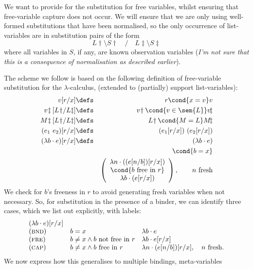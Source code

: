 We want to provide for the substitution
for free variables,
whilst ensuring that free-variable capture
does not occur.
We will ensure that we are only using well-formed substitutions
that have been normalised, so the only occurrence of list-variables
are in substitution pairs of the form
$$
L\!\!\dagger\!\setminus S\dagger \quad/\quad L\!\!\ddagger\!\setminus S\ddagger
$$
where all variables in $S$, if any, are known observation variables
(\emph{I'm not sure that this is a consequence of normalisation as described earlier}).

The scheme we follow is based on the following definition
of free-variable substitution for the $\lambda$-calculus,
(extended to (partially) support list-variables):
\begin{eqnarray*}
   v[r/x] &\defs& r \cond{x=v} v
\\ v\!\ddagger[L\!\dagger\! / L\ddagger]
   &\defs& v\!\dagger \cond{v \in \sem{L}} v\!\ddagger
\\ M\!\ddagger[L\!\dagger\! / L\ddagger]
   &\defs& L\!\dagger \cond{M=L} M\!\ddagger
\\ (e_1~e_2)[r/x] &\defs& (e_1[r/x])~(e_2[r/x])
\\ (\lambda b \cdot e)[r/x] &\defs& (\lambda b \cdot e)
\\&& \cond{b=x}
\\&& \left(
       \begin{array}{c}
         \lambda n \cdot ((e[n/b])[r/x]) \\
         \cond{b \mbox{ free in } r} \\
         \lambda b \cdot (e[r/x]) \\
       \end{array}
     \right)
     , \qquad n \mbox{ fresh}
\end{eqnarray*}
We check for $b$'s freeness in $r$ to avoid generating fresh
variables when not necessary.
So, for substitution in the presence of a binder, we can identify
three cases, which we list out explicitly, with labels:
$$\begin{array}{lll}
  (\lambda b \cdot e)[r/x]
\\ (\textsc{bnd}) & b=x & \lambda b \cdot e
\\ (\textsc{fre}) & b \neq x \land b \mbox{ not free in }r & \lambda b \cdot e[r/x]
\\ (\textsc{cap}) & b \neq x \land b \mbox{ free in }r & \lambda n \cdot (e[n/b])[r/x], \quad n \mbox{ fresh.}
\end{array}$$
We now express how this generalises to multiple bindings, meta-variables
